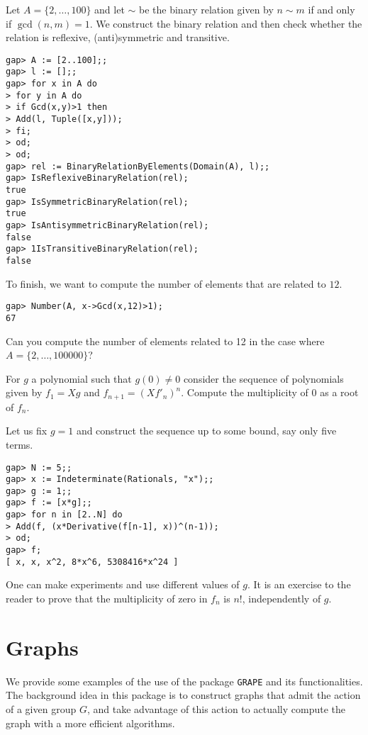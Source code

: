 \begin{example}
Let $A=\{2,\dots,100\}$ and let $\sim$ be the binary
relation given by $n\sim m$ if and only if $\gcd(n,m)=1$.
We construct the binary relation
and then check whether the relation is
reflexive, (anti)symmetric and transitive.

\begin{lstlisting}
gap> A := [2..100];;
gap> l := [];;
gap> for x in A do
> for y in A do
> if Gcd(x,y)>1 then
> Add(l, Tuple([x,y]));
> fi;
> od;
> od;
gap> rel := BinaryRelationByElements(Domain(A), l);;
gap> IsReflexiveBinaryRelation(rel);
true
gap> IsSymmetricBinaryRelation(rel);
true
gap> IsAntisymmetricBinaryRelation(rel);
false
gap> 1IsTransitiveBinaryRelation(rel);
false
\end{lstlisting}

To finish, we want to compute the number
of elements that are related to $12$.

\begin{lstlisting}
gap> Number(A, x->Gcd(x,12)>1);
67
\end{lstlisting}

Can you compute the number of elements
related to 12 in the case
where $A=\{2,\dots,100000\}$?
\end{example}

\begin{example}
For $g$ a polynomial such that $g(0)\ne 0$
consider the sequence of polynomials
given by $f_1=Xg$ and
$f_{n+1}=(Xf'_n)^n$. Compute the multiplicity
of $0$ as a root of $f_n$.

Let us fix $g=1$ and construct the sequence up to
some bound, say only five terms.
\begin{lstlisting}
gap> N := 5;;
gap> x := Indeterminate(Rationals, "x");;
gap> g := 1;;
gap> f := [x*g];;
gap> for n in [2..N] do
> Add(f, (x*Derivative(f[n-1], x))^(n-1));
> od;
gap> f;
[ x, x, x^2, 8*x^6, 5308416*x^24 ]
\end{lstlisting}

One can make experiments and use different values of $g$. It is an exercise to
the reader to prove that the multiplicity of zero in $f_n$ is $n!$,
independently of $g$.
\end{example}


\section{Graphs}

We provide some examples of the use of the package \texttt{GRAPE} and its functionalities.
The background idea in this package is to construct graphs that admit the action of a given group $G$, and take advantage of this action to actually compute the graph with a more efficient algorithms.

